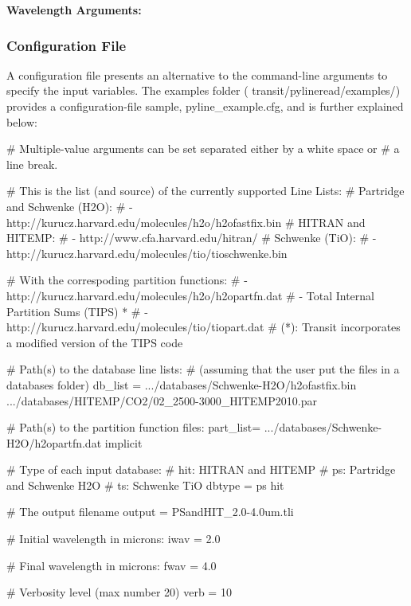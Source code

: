 \documentclass[letterpaper, 12pt]{article}
\begin{document}
{\bf Wavelength Arguments:} \newline
{}



\subsubsection{Configuration File}
\label{sec:pylinecfg}

A configuration file presents an alternative to the command-line
arguments to specify the input variables.  The examples folder ({\tttm
  transit/pylineread/examples/}) provides a configuration-file sample,
{\tttm pyline\_example.cfg}, and is further explained below: \newline

\begin{plain}
[Parameters]
# Multiple-value arguments can be set separated either by a white space or
# a line break.

# This is the list (and source) of the currently supported Line Lists:
# Partridge and Schwenke (H2O):
#   - http://kurucz.harvard.edu/molecules/h2o/h2ofastfix.bin
# HITRAN and HITEMP:
#   - http://www.cfa.harvard.edu/hitran/
# Schwenke (TiO):
#   - http://kurucz.harvard.edu/molecules/tio/tioschwenke.bin

# With the correspoding partition functions:
#   - http://kurucz.harvard.edu/molecules/h2o/h2opartfn.dat
#   - Total Internal Partition Sums (TIPS) *
#   - http://kurucz.harvard.edu/molecules/tio/tiopart.dat
# (*): Transit incorporates a modified version of the TIPS code

# Path(s) to the database line lists:
# (assuming that the user put the files in a databases folder)
db_list  = .../databases/Schwenke-H2O/h2ofastfix.bin
           .../databases/HITEMP/CO2/02_2500-3000_HITEMP2010.par

# Path(s) to the partition function files:
part_list= .../databases/Schwenke-H2O/h2opartfn.dat
           implicit

# Type of each input database:
#   hit:  HITRAN and HITEMP
#   ps:   Partridge and Schwenke H2O
#   ts:   Schwenke TiO
dbtype   = ps hit

# The output filename
output   = PSandHIT_2.0-4.0um.tli

# Initial wavelength in microns:
iwav     = 2.0

# Final wavelength in microns:
fwav     = 4.0

# Verbosity level (max number 20)
verb     = 10
\end{plain} 
\vspace{10pt}
\end{document}
